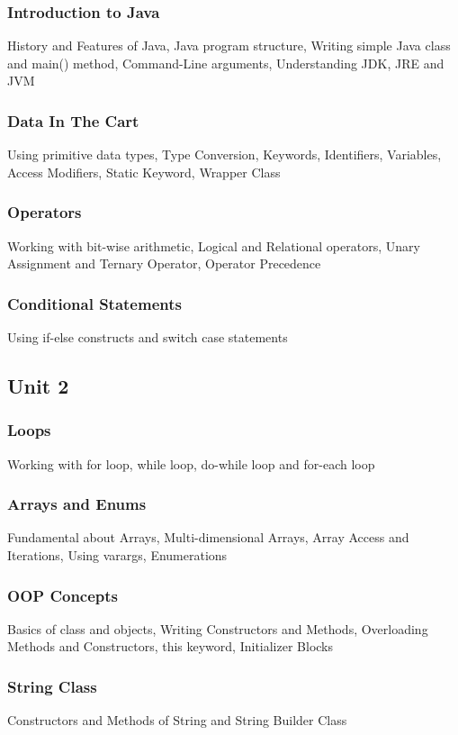 \documentclass{article}
\begin{document}
\begin{multicols*}{2}
    \subsubsection*{Introduction to Java}
    History and Features of Java, Java program structure, Writing simple Java class and main() method, Command-Line arguments, Understanding JDK, JRE and JVM
    \subsubsection*{Data In The Cart}
    Using primitive data types, Type Conversion, Keywords, Identifiers, Variables, Access Modifiers, Static Keyword, Wrapper Class
    \subsubsection*{Operators}
    Working with bit-wise arithmetic, Logical and Relational operators, Unary Assignment and Ternary Operator, Operator Precedence
    \subsubsection*{Conditional Statements}
    Using if-else constructs and switch case statements
    \subsection*{Unit 2}
    \subsubsection*{Loops}
    Working with for loop, while loop, do-while loop and for-each loop
    \subsubsection*{Arrays and Enums}
    Fundamental about Arrays, Multi-dimensional Arrays, Array Access and Iterations, Using varargs, Enumerations
    \subsubsection*{OOP Concepts}
    Basics of class and objects, Writing Constructors and Methods, Overloading Methods and Constructors, this keyword, Initializer Blocks
    \subsubsection*{String Class}
    Constructors and Methods of String and String Builder Class

\end{multicols*}
\end{document}
